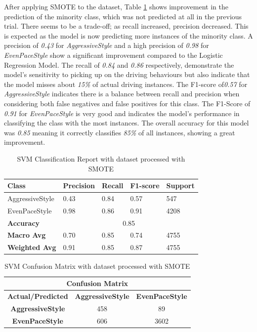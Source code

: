 \documentclass[10pt,journal,compsoc]{IEEEtran}
\begin{document}
After applying SMOTE to the dataset, Table \ref{table:classification_report_smote} shows improvement in the prediction of the minority class, which was not predicted at all 
in the previous trial. There seems to be a trade-off; as recall increased, precision decreased. This is expected as the model is now predicting more instances of the minority class.
A precision of \textit{0.43} for \textit{AggressiveStyle} and a high precision of \textit{0.98} for \textit{EvenPaceStyle} show a significant improvement compared to the Logistic Regression Model.
The recall of \textit{0.84} and \textit{0.86} respectively, demonstrate the model's sensitivity to picking up on the driving behaviours but also indicate that the model misses about \textit{15\%} of actual driving instances. 
The F1-score of\textit{0.57} for \textit{AggressiveStyle} indicates there is a balance between recall and precision when considering both false negatives and false
positives for this class. The F1-Score of \textit{0.91} for \textit{EvenPaceStyle} is very good and indicates the model's performance in classifying the class with the most instances.
The overall accuracy for this model was \textit{0.85} meaning it correctly classifies \textit{85\%} of all instances, showing a great improvement.

\begin{table}[h]
    \centering    
    \begin{tabular}{|l|l|l|l|l|}
    \hline
    \textbf{Class} & \textbf{Precision} & \textbf{Recall} & \textbf{F1-score} & \textbf{Support} \\ \hline
    AggressiveStyle & 0.43 & 0.84 & 0.57 & 547 \\ \hline
    EvenPaceStyle & 0.98 & 0.86 & 0.91 & 4208 \\ \hline
    \textbf{Accuracy} & \multicolumn{4}{c|}{0.85} \\ \hline
    \textbf{Macro Avg} & 0.70 & 0.85 & 0.74 & 4755 \\ \hline
    \textbf{Weighted Avg} & 0.91 & 0.85 & 0.87 & 4755 \\ \hline
    \end{tabular}
    \caption{SVM Classification Report with dataset processed with SMOTE}
    \label{table:classification_report_smote}
\end{table}

\begin{table}[h]
    \centering
    \begin{tabular}{|c|c|c|}
    \hline
    \multicolumn{3}{|c|}{\textbf{Confusion Matrix}} \\
    \hline
    \textbf{Actual/Predicted} & \textbf{AggressiveStyle} & \textbf{EvenPaceStyle} \\ \hline
    \textbf{AggressiveStyle} & 458 & 89 \\ \hline
    \textbf{EvenPaceStyle} & 606 & 3602 \\ \hline
    \end{tabular}
    \caption{SVM Confusion Matrix with dataset processed with SMOTE}
    \label{table:confusion_matrix_smote}
\end{table}
\end{document}
